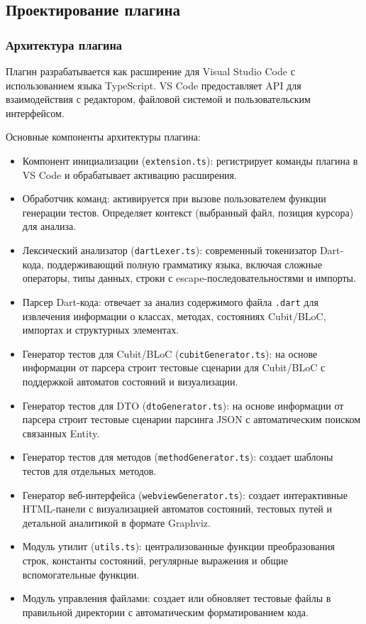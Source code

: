 \documentclass[14pt, russian]{scrartcl}
\begin{document}
\subsection{Проектирование плагина}

\subsubsection{Архитектура плагина}
Плагин разрабатывается как расширение для Visual Studio Code с использованием языка TypeScript. VS Code предоставляет API для взаимодействия с редактором, файловой системой и пользовательским интерфейсом.

Основные компоненты архитектуры плагина:
\begin{itemize}
    \item Компонент инициализации (\texttt{extension.ts}): регистрирует команды плагина в VS Code и обрабатывает активацию расширения.
    \item Обработчик команд: активируется при вызове пользователем функции генерации тестов. Определяет контекст (выбранный файл, позиция курсора) для анализа.
    \item Лексический анализатор (\texttt{dartLexer.ts}): современный токенизатор Dart-кода, поддерживающий полную грамматику языка, включая сложные операторы, типы данных, строки с escape-последовательностями и импорты.
    \item Парсер Dart-кода: отвечает за анализ содержимого файла \texttt{.dart} для извлечения информации о классах, методах, состояниях Cubit/BLoC, импортах и структурных элементах.
    \item Генератор тестов для Cubit/BLoC (\texttt{cubitGenerator.ts}): на основе информации от парсера строит тестовые сценарии для Cubit/BLoC с поддержкой автоматов состояний и визуализации.
    \item Генератор тестов для DTO (\texttt{dtoGenerator.ts}): на основе информации от парсера строит тестовые сценарии парсинга JSON с автоматическим поиском связанных Entity.
    \item Генератор тестов для методов (\texttt{methodGenerator.ts}): создает шаблоны тестов для отдельных методов.
    \item Генератор веб-интерфейса (\texttt{webviewGenerator.ts}): создает интерактивные HTML-панели с визуализацией автоматов состояний, тестовых путей и детальной аналитикой в формате Graphviz.
    \item Модуль утилит (\texttt{utils.ts}): централизованные функции преобразования строк, константы состояний, регулярные выражения и общие вспомогательные функции.
    \item Модуль управления файлами: создает или обновляет тестовые файлы в правильной директории с автоматическим форматированием кода.
\end{itemize}
\end{document}
